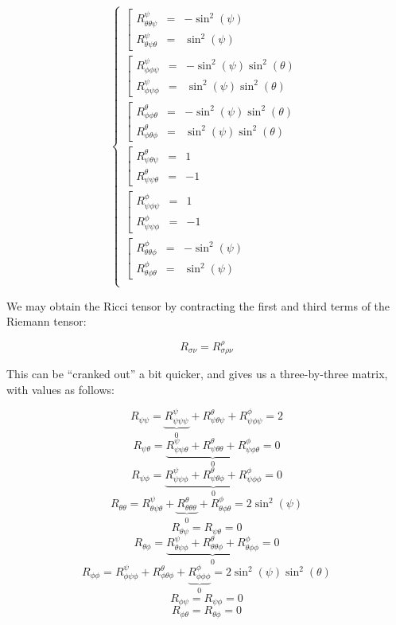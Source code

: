 \begin{enumerate}
\begin{enumerate}
        $$\boxed{\left\{\begin{array}{l} \left[\begin{array}{lll}  R^{\psi}_{\theta\theta\psi}&=&-\sin^2(\psi)\\R^{\psi}_{\theta\psi\theta}&=&\sin^2(\psi)\end{array} \\ \left[\begin{array}{lll}  R^{\psi}_{\phi\phi\psi}&=&-\sin^2(\psi)\sin^2(\theta)\\R^{\psi}_{\phi\psi\phi}&=&\sin^2(\psi)\sin^2(\theta)\end{array} \\\left[\begin{array}{lll}  R^{\theta}_{\phi\phi\theta}&=&-\sin^2(\psi)\sin^2(\theta)\\R^{\theta}_{\phi\theta\phi}&=&\sin^2(\psi)\sin^2(\theta)\end{array} \\\left[\begin{array}{lll}  R^{\theta}_{\psi\theta\psi}&=&1\\R^{\theta}_{\psi\psi\theta}&=&-1\end{array} \\\left[\begin{array}{lll}  R^{\phi}_{\psi\phi\psi}&=&1\\R^{\phi}_{\psi\psi\phi}&=&-1\end{array} \\\left[\begin{array}{lll}  R^{\phi}_{\theta\theta\phi}&=&-\sin^2(\psi)\\R^{\phi}_{\theta\phi\theta}&=&\sin^2(\psi)\end{array} \\\end{array}}$$

        We may obtain the Ricci tensor by contracting the first and third terms of the Riemann tensor:

        $$R_{\sigma\nu}=R^{\rho}_{\sigma\rho\nu}$$

        This can be ``cranked out'' a bit quicker, and gives us a three-by-three matrix, with values as follows:

        $$R_{\psi\psi}=\underbrace{R^{\psi}_{\psi\psi\psi}}_0+R^{\theta}_{\psi\theta\psi}+R^{\phi}_{\psi\phi\psi}=2$$
        $$R_{\psi\theta}=\underbrace{R^{\psi}_{\psi\psi\theta}+R^{\theta}_{\psi\theta\theta}+R^{\phi}_{\psi\phi\theta}}_0=0$$
        $$R_{\psi\phi}=\underbrace{R^{\psi}_{\psi\psi\phi}+R^{\theta}_{\psi\theta\phi}+R^{\phi}_{\psi\phi\phi}}_0=0$$
        $$R_{\theta\theta}=R^{\psi}_{\theta\psi\theta}+\underbrace{R^{\theta}_{\theta\theta\theta}}_0+R^{\phi}_{\theta\phi\theta}=2\sin^2(\psi)$$
        $$R_{\theta\psi}=R_{\psi\theta}=0$$
        $$R_{\theta\phi}=\underbrace{R^{\psi}_{\theta\psi\phi}+R^{\theta}_{\theta\theta\phi}+R^{\phi}_{\theta\phi\phi}}_0=0$$
        $$R_{\phi\phi}=R^{\psi}_{\phi\psi\phi}+R^{\theta}_{\phi\theta\phi}+\underbrace{R^{\phi}_{\phi\phi\phi}}_0=2\sin^2(\psi)\sin^2(\theta)$$
        $$R_{\phi\psi}=R_{\psi\phi}=0$$
        $$R_{\phi\theta}=R_{\theta\phi}=0$$


\end{enumerate}
\end{enumerate}
